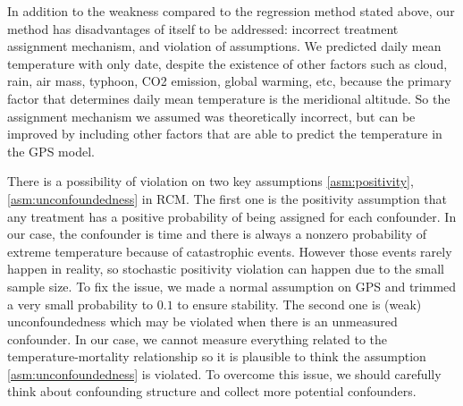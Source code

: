 \documentclass[12pt]{article}
\begin{document}
In addition to the weakness compared to the regression method stated above,
our method has disadvantages of itself to be addressed:
incorrect treatment assignment mechanism, and violation of assumptions.
We predicted daily mean temperature with only date,
despite the existence of other factors such as 
cloud, rain, air mass, typhoon, CO2 emission, global warming, etc,
because the primary factor that determines daily mean temperature is the meridional altitude.
So the assignment mechanism we assumed was theoretically incorrect,
but can be improved by including other factors that are able to predict the temperature in the GPS model.

There is a possibility of violation on 
two key assumptions \ref{asm:positivity},\ref{asm:unconfoundedness} in RCM.
The first one is the positivity assumption
that any treatment has a positive probability of being assigned for each confounder.
In our case, the confounder is time and 
there is always a nonzero probability of extreme temperature because of catastrophic events.
However those events rarely happen in reality, 
so stochastic positivity violation\cite{zivich2022} can happen due to the small sample size.
To fix the issue, we made a normal assumption on GPS
and trimmed a very small probability to $0.1$ to ensure stability.
The second one is (weak) unconfoundedness
which may be violated when there is an unmeasured confounder.
In our case, we cannot measure everything related to the temperature-mortality relationship
so it is plausible to think the assumption \ref{asm:unconfoundedness} is violated.
To overcome this issue, we should carefully think about confounding structure
and collect more potential confounders.


{}

\end{document}
